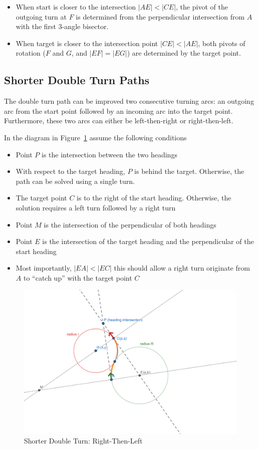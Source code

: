 \documentclass{article}
\begin{document}
\begin{itemize}
  \item When start is closer to the intersection $|AE| < |CE|$, the pivot of the
  outgoing turn at $F$ is determined from the perpendicular intersection from $A$
  with the first 3-angle bisector.
  \item When target is closer to the intersection point $|CE| < |AE|$, both
  pivots of rotation ($F$ and $G$, and $|EF| = |EG|$) are determined by the target point.
\end{itemize}

\subsection*{Shorter Double Turn Paths}
The double turn path can be improved two consecutive turning arcs: an outgoing arc from the start point
followed by an incoming arc into the target point. Furthermore, these two arcs can either be 
left-then-right or right-then-left.

In the diagram in Figure~\ref{fig:double-RL} assume the following conditions
\begin{itemize}
  \item Point $P$ is the intersection between the two headings
  \item With respect to the target heading, $P$ is behind the target. Otherwise, the path
  can be solved using a single turn.
  \item The target point $C$ is to the right of the start heading. Otherwise, the solution requires
  a left turn followed by a right turn
  \item Point $M$ is the intersection of the perpendicular of both headings
  \item Point $E$ is the intersection of the target heading and the perpendicular of the start heading
  \item Most importantly, $|EA| < |EC|$ this should allow a right turn originate from $A$ to ``catch up''
  with the target point $C$
\end{itemize}

\begin{figure}[hbt]
\includegraphics[width=12cm]{screenshots/double-turns-right-left.png}
\caption{Shorter Double Turn: Right-Then-Left}
\label{fig:double-RL}
\end{figure}
\end{document}
